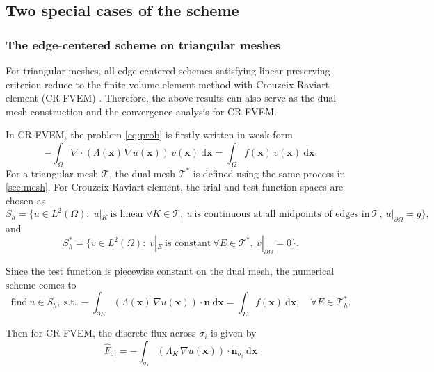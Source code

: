 \documentclass[times,review,preprint,authoryear]{elsarticle}
\newcommand{\bx}{\bm{x}}
\newcommand{\bn}{\bm{n}}
\begin{document}
\subsection{Two special cases of the scheme}

\subsubsection{The edge-centered scheme on triangular meshes}

For triangular meshes, all edge-centered schemes satisfying linear preserving criterion reduce to the finite volume element method with Crouzeix-Raviart element (CR-FVEM) \cite{chatzipantelidis_finite_1999}. Therefore, the above results can also serve as the dual mesh construction and the convergence analysis for CR-FVEM.

In CR-FVEM, the problem \cref{eq:prob} is firstly written in weak form
\begin{equation*}
-\int_{\Omega} \nabla \cdot (\Lambda(\bx) \, \nabla u(\bx)) \, v(\bx) \ \mathrm{d}\bx = \int_{\Omega} f(\bx) \, v(\bx) \ \mathrm{d}\bx.
\end{equation*}
For a triangular mesh $\mathcal{T}$, the dual mesh $\mathcal{T}^*$ is defined using the same process in \cref{sec:mesh}. For Crouzeix-Raviart element, the trial and test function spaces are chosen as
\begin{equation*}
S_h = \{u \in L^2(\Omega): \; u|_K \ \text{is linear} \ \forall K \in \mathcal{T}, \ u \ \text{is continuous at all midpoints of edges in} \ \mathcal{T}, \ u|_{\partial \Omega} = g\},
\end{equation*}
and
\begin{equation*}
S^*_h = \{v \in L^2(\Omega): \; v|_{E} \ \text{is constant} \ \forall E \in \mathcal{T}^*, \ v|_{\partial \Omega} = 0\}.
\end{equation*}

Since the test function is piecewise constant on the dual mesh, the numerical scheme comes to
\begin{equation}\label{eq:crfvem}
\text{find} \ u \in S_h, \ \text{s.t.} \ - \int_{\partial E} (\Lambda(\bx) \, \nabla u(\bx)) \cdot \bn \ \mathrm{d} \bx = \int_{E} f(\bx) \ \mathrm{d} \bx, \quad \forall E \in \mathcal{T}^*_h.
\end{equation}

Then for CR-FVEM, the discrete flux across $\sigma_i$ is given by
\begin{equation*}
\hat{F}_{\sigma_{i}} = - \int_{\sigma_{i}} (\Lambda_K \, \nabla u(\bx)) \cdot \bn_{\sigma_{i}} \ \mathrm{d} \bx
\end{equation*}
\end{document}
